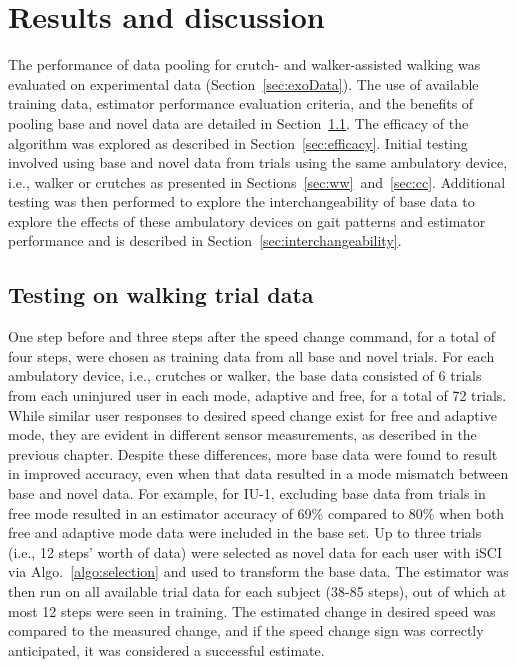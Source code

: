 \section{Results and discussion} \label{sec:results}

The performance of data pooling for crutch- and walker-assisted walking was evaluated on experimental data (Section~\ref{sec:exoData}). The use of available training data, estimator performance evaluation criteria, and the benefits of pooling base and novel data are detailed in Section~\ref{sec:testing}. The efficacy of the algorithm was explored as described in Section~\ref{sec:efficacy}. Initial testing involved using base and novel data from trials using the same ambulatory device, i.e., walker or crutches as presented in Sections~\ref{sec:ww}~and~\ref{sec:cc}. Additional testing was then performed to explore the interchangeability of base data to explore the effects of these ambulatory devices on gait patterns and estimator performance and is described in Section~\ref{sec:interchangeability}.

\subsection{Testing on walking trial data}\label{sec:testing}
One step before and three steps after the speed change command, for a total of four steps, were chosen as training data from all base and novel trials. For each ambulatory device, i.e., crutches or walker, the base data consisted of 6 trials from each uninjured user in each mode, adaptive and free, for a total of 72 trials. While similar user responses to desired speed change exist for free and adaptive mode, they are evident in different sensor measurements, as described in the previous chapter. Despite these differences, more base data were found to result in improved accuracy, even when that data resulted in a mode mismatch between base and novel data. For example, for IU-1, excluding base data from trials in free mode resulted in an estimator accuracy of 69\% compared to 80\% when both free and adaptive mode data were included in the base set. Up to three trials (i.e., 12 steps' worth of data) were selected as novel data for each user with iSCI via Algo.~\ref{algo:selection} and used to transform the base data. The estimator was then run on all available trial data for each subject (38-85 steps), out of which at most 12 steps were seen in training. The estimated change in desired speed was compared to the measured change, and if the speed change sign was correctly anticipated, it was considered a successful estimate.

